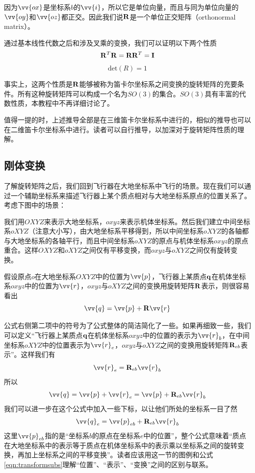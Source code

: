 \documentclass[11pt]{article}
\begin{document}
因为$\vv{ox}$是坐标系$b$的$\vv{i}$，所以它是单位向量，而且与同为单位向量的$\vv{oy}$和$\vv{oz}$都正交。因此我们说${\bf R}$是一个单位正交矩阵（orthonormal matrix）。

通过基本线性代数之后和涉及叉乘的变换，我们可以证明以下两个性质
$$
{\bf R}^T{\bf R} = {\bf R}{\bf R}^T = \bf{I}
$$
$$
\text{det}(R) = 1
$$

事实上，这两个性质是${\bf R}$能够被称为笛卡尔坐标系之间变换的旋转矩阵的充要条件。所有这种旋转矩阵可以构成一个名为$SO(3)$的集合。$SO(3)$具有丰富的代数性质，本教程中不再详细讨论了。

值得一提的时，上述推导全部是在三维笛卡尔坐标系中进行的，相似的推导也可以在二维笛卡尔坐标系中进行。读者可以自行推导，以加深对于旋转矩阵性质的理解。

\subsection{刚体变换}\label{sec:transform}
了解旋转矩阵之后，我们回到飞行器在大地坐标系中飞行的场景。现在我们可以通过一个辅助坐标系来描述飞行器上某个质点相对与大地坐标系原点的位置关系了。考虑下图中的场景：

我们用$OXYZ$来表示大地坐标系，$oxyz$来表示机体坐标系。然后我们建立中间坐标系$oXYZ$（注意大小写），由大地坐标系平移得到，所以中间坐标系$oXYZ$的各轴都与大地坐标系的各轴平行，而且中间坐标系$oXYZ$的原点与机体坐标系$oxyz$的原点重合。这样$OXYZ$和$oXYZ$之间仅有平移变换，而$oxyz$与$oXYZ$之间仅有旋转变换。

假设原点$o$在大地坐标系$OXYZ$中的位置为$\vv{p}$，飞行器上某质点$\bf{q}$在机体坐标系$oxyz$中的位置为$\vv{r}$，$oxyz$与$oXYZ$之间的变换用旋转矩阵${\bf R}$表示，则很容易看出
\begin{equation}\label{eqn:transform}
\vv{q} = \vv{p} + {\bf R}\vv{r}
\end{equation}

公式右侧第二项中的符号为了公式整体的简洁简化了一些。如果再细致一些，我们可以定义“飞行器上某质点$\bf{q}$在机体坐标系$oxyz$中的位置的表示为$\vv{r}_b$，在中间坐标系$oXYZ$中的位置表示为$\vv{r}_e$，$oxyz$与$oXYZ$之间的变换用旋转矩阵${\bf R}_{eb}$表示”。这样我们有
$$
\vv{r}_e = {\bf R}_{eb}\vv{r}_b
$$
所以
$$
\vv{q} = \vv{p} + \vv{r}_e = \vv{p} + {\bf R}_{eb}\vv{r}_b
$$
我们可以进一步在这个公式中加入一些下标，以让他们所处的坐标系一目了然
\begin{equation}\label{eqn:transformsubs}
\vv{q}_{e} = \vv{p}_{eb} + {\bf R}_{eb}\vv{r}_b
\end{equation}
这里$\vv{p}_{eb}$指的是“坐标系$b$的原点在坐标系$e$中的位置”，整个公式意味着“质点在大地坐标系中的表示等于质点在机体坐标系中的表示乘以坐标系之间的旋转变换，再加上坐标系之间的平移变换”。读者应该用这一节的图例和公式\ref{eqn:transformsubs}理解“位置”、“表示”、“变换”之间的区别与联系。
\end{document}
